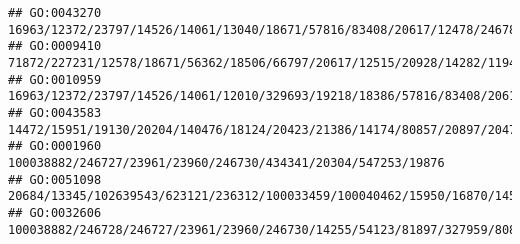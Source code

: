 \documentclass[
]{article}
\begin{document}
\begin{verbatim}
## GO:0043270                                                                                                                                                                                                                                                                                                       16963/12372/23797/14526/14061/13040/18671/57816/83408/20617/12478/246788/20304/14169/14419/12482/12766
## GO:0009410                                                                                                                                                                                                                                      71872/227231/12578/18671/56362/18506/66797/20617/12515/20928/14282/11944/13237/432530/18126/20303/218630/17224/18095/13101/13105/380997/223706/13078/72082/433247/12780
## GO:0010959                                                                                                                                                                                                                                                      16963/12372/23797/14526/14061/12010/329693/19218/18386/57816/83408/20617/20928/16170/12478/81897/246788/20304/14169/22337/14419/24115/12482/14126/12766
## GO:0043583                                                                                                                                                                                                                                                                                                14472/15951/19130/20204/140476/18124/20423/21386/14174/80857/20897/20474/14165/21380/14972/14998/15024/224796
## GO:0001960                                                                                                                                                                                                                                                                                                                                                100038882/246727/23961/23960/246730/434341/20304/547253/19876
## GO:0051098                                                                                                                                                                                                                                                                  20684/13345/102639543/623121/236312/100033459/100040462/15950/16870/14526/12010/20568/12578/20423/15110/20666/16364/17702/12143/21943/15958
## GO:0032606                                                                                                                                                                                                                                                                                                                              100038882/246728/246727/23961/23960/246730/14255/54123/81897/327959/80861/12475

\end{verbatim}
\end{document}
